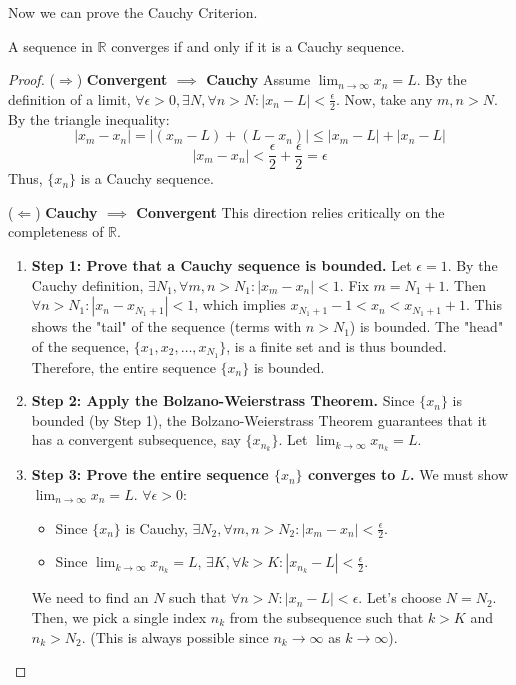 \documentclass[oneside]{book}
\begin{document}
Now we can prove the Cauchy Criterion.

\begin{theorem}
\label{thm:cauchy_en}
A sequence in $\mathbb{R}$ converges if and only if it is a Cauchy sequence.
\end{theorem}

\begin{proof}
($\Rightarrow$) \textbf{Convergent $\implies$ Cauchy}
Assume $\lim_{n \to \infty} x_n = L$.
By the definition of a limit, $\forall \epsilon > 0, \exists N, \forall n > N: |x_n - L| < \frac{\epsilon}{2}$.
Now, take any $m, n > N$. By the triangle inequality:
\[
|x_m - x_n| = |(x_m - L) + (L - x_n)| \leq |x_m - L| + |x_n - L|
\]
\[
|x_m - x_n| < \frac{\epsilon}{2} + \frac{\epsilon}{2} = \epsilon
\]
Thus, $\{x_n\}$ is a Cauchy sequence.

($\Leftarrow$) \textbf{Cauchy $\implies$ Convergent}
This direction relies critically on the completeness of $\mathbb{R}$.
\begin{enumerate}
    \item \textbf{Step 1: Prove that a Cauchy sequence is bounded.}
    Let $\epsilon = 1$. By the Cauchy definition, $\exists N_1, \forall m, n > N_1: |x_m - x_n| < 1$.
    Fix $m = N_1 + 1$. Then $\forall n > N_1: |x_n - x_{N_1+1}| < 1$, which implies $x_{N_1+1} - 1 < x_n < x_{N_1+1} + 1$.
    This shows the "tail" of the sequence (terms with $n > N_1$) is bounded.
    The "head" of the sequence, $\{x_1, x_2, \dots, x_{N_1}\}$, is a finite set and is thus bounded.
    Therefore, the entire sequence $\{x_n\}$ is bounded.
    
    \item \textbf{Step 2: Apply the Bolzano-Weierstrass Theorem.}
    Since $\{x_n\}$ is bounded (by Step 1), the Bolzano-Weierstrass Theorem guarantees that it has a convergent subsequence, say $\{x_{n_k}\}$.
    Let $\lim_{k \to \infty} x_{n_k} = L$.
    
    \item \textbf{Step 3: Prove the entire sequence $\{x_n\}$ converges to $L$.}
    We must show $\lim_{n \to \infty} x_n = L$.
    $\forall \epsilon > 0$:
    \begin{itemize}
        \item Since $\{x_n\}$ is Cauchy, $\exists N_2, \forall m, n > N_2: |x_m - x_n| < \frac{\epsilon}{2}$.
        \item Since $\lim_{k \to \infty} x_{n_k} = L$, $\exists K, \forall k > K: |x_{n_k} - L| < \frac{\epsilon}{2}$.
    \end{itemize}
    We need to find an $N$ such that $\forall n > N: |x_n - L| < \epsilon$.
    Let's choose $N = N_2$. Then, we pick a single index $n_k$ from the subsequence such that $k > K$ and $n_k > N_2$. (This is always possible since $n_k \to \infty$ as $k \to \infty$).
    

\end{enumerate}
\end{proof}
\end{document}

